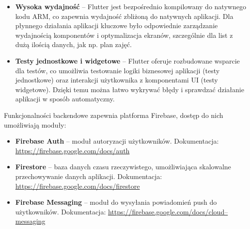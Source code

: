 \begin{itemize}
  \item \textbf{Wysoka wydajność} – Flutter jest bezpośrednio kompilowany do natywnego kodu ARM, co zapewnia wydajność zbliżoną do natywnych aplikacji. Dla płynnego działania aplikacji kluczowe było odpowiednie zarządzanie wydajnością komponentów i optymalizacja ekranów, szczególnie dla list z dużą ilością danych, jak np. plan zajęć.
  \item \textbf{Testy jednostkowe i widgetowe} – Flutter oferuje rozbudowane wsparcie dla testów, co umożliwia testowanie logiki biznesowej aplikacji (testy jednostkowe) oraz interakcji użytkownika z komponentami UI (testy widgetowe). Dzięki temu można łatwo wykrywać błędy i sprawdzać działanie aplikacji w sposób automatyczny.
\end{itemize}

\noindent Funkcjonalności backendowe zapewnia platforma Firebase, dostęp do nich umożliwiają moduły:

\begin{itemize}
  \item \textbf{Firebase Auth} – moduł autoryzacji użytkowników. Dokumentacja: \url{https://firebase.google.com/docs/auth}
  \item \textbf{Firestore} – baza danych czasu rzeczywistego, umożliwiająca skalowalne przechowywanie danych aplikacji. Dokumentacja: \url{https://firebase.google.com/docs/firestore}
  \item \textbf{Firebase Messaging} – moduł do wysyłania powiadomień push do użytkowników. Dokumentacja: \url{https://firebase.google.com/docs/cloud–messaging}
\end{itemize}
